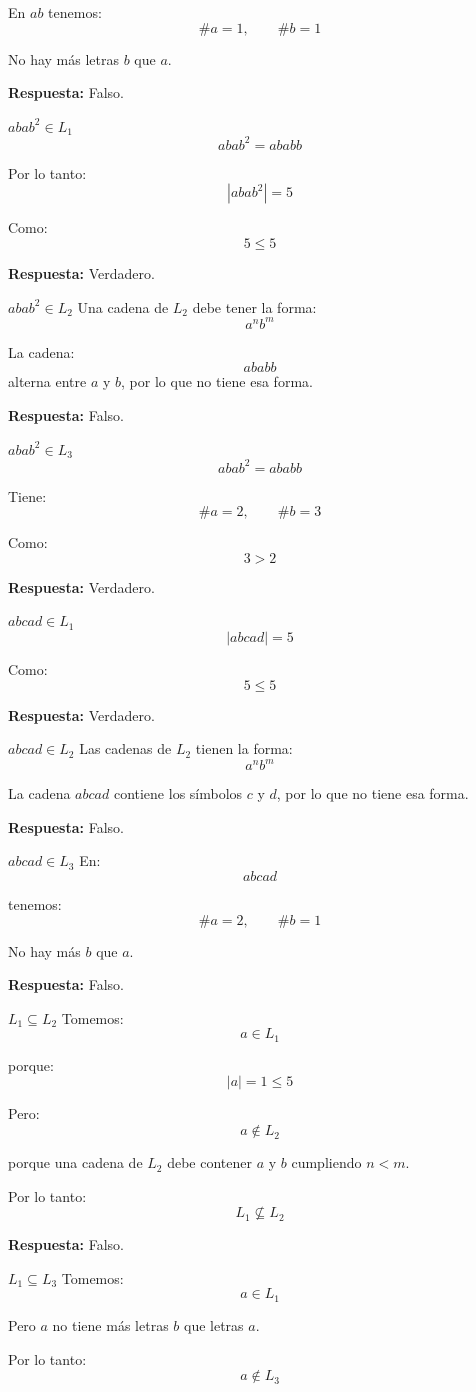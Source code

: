 \documentclass[12pt]{article}
\begin{document}
En $ab$ tenemos:
\[
\#a=1,\qquad\#b=1
\]

No hay más letras $b$ que $a$.

\textbf{Respuesta:} Falso.

\textbf{$abab^2\in L_1$ }
\[
abab^2=ababb
\]

Por lo tanto:
\[
|abab^2|=5
\]

Como:
\[
5\leq5
\]

\textbf{Respuesta:} Verdadero.

\textbf{$abab^2\in L_2$ }
Una cadena de $L_2$ debe tener la forma:
\[
a^nb^m
\]

La cadena:
\[
ababb
\]
alterna entre $a$ y $b$, por lo que no tiene esa forma.

\textbf{Respuesta:} Falso.

\textbf{$abab^2\in L_3$}
\[
abab^2=ababb
\]

Tiene:
\[
\#a=2,\qquad\#b=3
\]

Como:
\[
3>2
\]

\textbf{Respuesta:} Verdadero.

\textbf{$abcad\in L_1$}
\[
|abcad|=5
\]

Como:
\[
5\leq5
\]

\textbf{Respuesta:} Verdadero.

\textbf{$abcad\in L_2$}
Las cadenas de $L_2$ tienen la forma:
\[
a^nb^m
\]

La cadena $abcad$ contiene los símbolos $c$ y $d$, por lo que no tiene esa forma.

\textbf{Respuesta:} Falso.

\textbf{$abcad\in L_3$}
En:
\[
abcad
\]

tenemos:
\[
\#a=2,\qquad\#b=1
\]

No hay más $b$ que $a$.

\textbf{Respuesta:} Falso.

\textbf{$L_1\subseteq L_2$}
Tomemos:
\[
a\in L_1
\]

porque:
\[
|a|=1\leq5
\]

Pero:
\[
a\notin L_2
\]

porque una cadena de $L_2$ debe contener $a$ y $b$ cumpliendo $n<m$.

Por lo tanto:
\[
L_1\nsubseteq L_2
\]

\textbf{Respuesta:} Falso.

\textbf{$L_1\subseteq L_3$ }
Tomemos:
\[
a\in L_1
\]

Pero $a$ no tiene más letras $b$ que letras $a$.

Por lo tanto:
\[
a\notin L_3
\]
\end{document}
